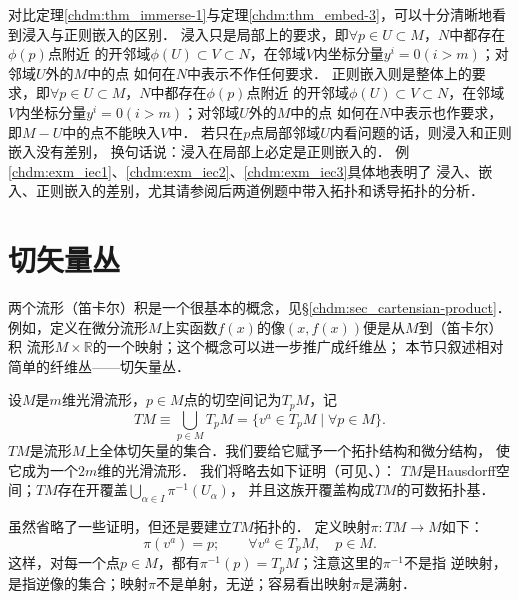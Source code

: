 对比定理\ref{chdm:thm_immerse-1}与定理\ref{chdm:thm_embed-3}，可以十分清晰地看到浸入与正则嵌入的区别．
浸入只是局部上的要求，即$\forall p\in U\subset M$，$N$中都存在$\phi(p)$点附近
的开邻域$\phi(U)\subset V\subset N$，在邻域$V$内坐标分量$y^i=0(i>m)$；对邻域$U$外的$M$中的点
如何在$N$中表示不作任何要求．
正则嵌入则是整体上的要求，即$\forall p\in U\subset M$，$N$中都存在$\phi(p)$点附近
的开邻域$\phi(U)\subset V\subset N$，在邻域$V$内坐标分量$y^i=0(i>m)$；对邻域$U$外的$M$中的点
如何在$N$中表示也作要求，即$M-U$中的点不能映入$V$中．
若只在$p$点局部邻域$U$内看问题的话，则浸入和正则嵌入没有差别，
换句话说：浸入{\kaishu 在局部上}必定是正则嵌入的．
例\ref{chdm:exm_iec1}、\ref{chdm:exm_iec2}、\ref{chdm:exm_iec3}具体地表明了
浸入、嵌入、正则嵌入的差别，尤其请参阅后两道例题中带入拓扑和诱导拓扑的分析．






\section{切矢量丛}\label{chdm:sec_tangent-bundles}
两个流形（笛卡尔）积是一个很基本的概念，见\S \ref{chdm:sec_cartensian-product}．
例如，定义在微分流形$M$上实函数$f(x)$的像$(x,f(x))$便是从$M$到（笛卡尔）积
流形$M\times \mathbb{R}$的一个映射；这个概念可以进一步推广成{\kaishu 纤维丛}；
本节只叙述相对简单的纤维丛——切矢量丛．



设$M$是$m$维光滑流形，$p\in M$点的切空间记为$T_pM$，记
\begin{equation}\label{chdm:eqn_tangent-bundle-set}
    TM \equiv \bigcup _{p\in M} T_pM = \{v^a \in T_pM \mid \forall p\in M\} .
\end{equation}
$TM$是流形$M$上全体切矢量的集合．我们要给它赋予一个拓扑结构和微分结构，
使它成为一个$2m$维的光滑流形．
我们将略去如下证明（可见\parencite[\S 3.1]{chenwh2001}、\parencite[\S 12.1]{tu-IM-2011}）：
$TM$是Hausdorff空间；$TM$存在开覆盖$\bigcup _{\alpha\in I} \pi^{-1} (U_\alpha)$，
并且这族开覆盖构成$TM$的可数拓扑基．

虽然省略了一些证明，但还是要建立$TM$拓扑的．
定义映射$\pi:TM\to M$如下：
\begin{equation}
    \pi(v^a) = p; \qquad \forall v^a\in T_pM,\quad p\in M.
\end{equation}
这样，对每一个点$p\in M$，都有$\pi^{-1}(p)=T_pM$；注意这里的$\pi^{-1}$不是指
逆映射，是指逆像的集合；映射$\pi$不是单射，无逆；容易看出映射$\pi$是满射．

